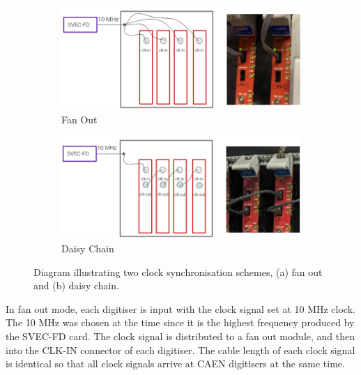 \begin{figure}[b!]
\begin{subfigure}[h]{0.495\linewidth}
\centering    
\includegraphics[width=\linewidth]{fanout}
\caption{Fan Out}
\end{subfigure}%
\hfill
\begin{subfigure}[h]{0.495\linewidth}
\centering    
\includegraphics[width=\linewidth]{daisychain}
\caption{Daisy Chain}
\end{subfigure}
\caption[Clock Synchronisation Schemes]{
Diagram illustrating two clock synchronisation schemes, (a) fan out and (b) daisy chain.
}
\label{fig:clockScheme}
\end{figure}

In fan out mode, each digitiser is input with the clock signal set at 10 MHz clock.
The 10 MHz was chosen at the time since it is the highest frequency produced by the SVEC-FD card.
The clock signal is distributed to a fan out module, and then into the CLK-IN connector of each digitiser.
The cable length of each clock signal is identical so that all clock signals arrive at CAEN digitisers at the same time.



